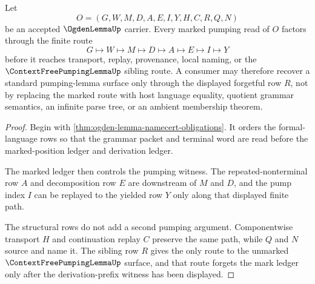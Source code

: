 \begin{theorem}
\label{thm:ogden-lemma-marked-position-pumping-route}
Let
$$
O=(G,W,M,D,A,E,I,Y,H,C,R,Q,N)
$$
be an accepted $\OgdenLemmaUp$ carrier. Every marked pumping read of $O$
factors through the finite route
$$
G \longmapsto W \longmapsto M \longmapsto D \longmapsto A
\longmapsto E \longmapsto I \longmapsto Y
$$
before it reaches transport, replay, provenance, local naming, or the
$\ContextFreePumpingLemmaUp$ sibling route. A consumer may therefore recover a
standard pumping-lemma surface only through the displayed forgetful row $R$,
not by replacing the marked route with host language equality, quotient grammar
semantics, an infinite parse tree, or an ambient membership theorem.
\end{theorem}
\begin{proof}
Begin with \autoref{thm:ogden-lemma-namecert-obligations}. It orders the
formal-language rows so that the grammar packet and terminal word are read
before the marked-position ledger and derivation ledger.

The marked ledger then controls the pumping witness. The repeated-nonterminal
row $A$ and decomposition row $E$ are downstream of $M$ and $D$, and the pump
index $I$ can be replayed to the yielded row $Y$ only along that displayed
finite path.

The structural rows do not add a second pumping argument. Componentwise
transport $H$ and continuation replay $C$ preserve the same path, while $Q$ and
$N$ source and name it. The sibling row $R$ gives the only route to the
unmarked $\ContextFreePumpingLemmaUp$ surface, and that route forgets the mark
ledger only after the derivation-prefix witness has been displayed.
\end{proof}


